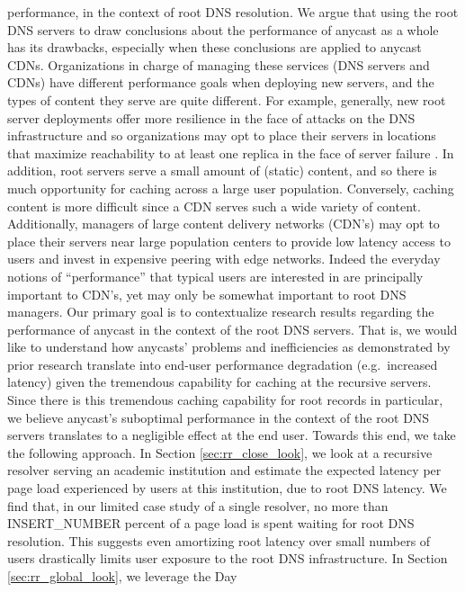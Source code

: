 \documentclass[sigconf,nonacm,10pt]{acmart}
\begin{document}
performance, in the context of root DNS resolution. \break \break
We argue that using the root DNS servers to draw conclusions about the
performance of anycast as a whole has its drawbacks, especially when
these conclusions are applied to anycast CDNs. Organizations in charge
of managing these services (DNS servers and CDNs) have different
performance goals when deploying new servers, and the types of content
they serve are quite different. For example, generally, new root server
deployments offer more resilience in the face of attacks on the DNS
infrastructure and so organizations may opt to place their servers in
locations that maximize reachability to at least one replica in the face
of server failure \cite{moura2016anycast}. In addition, root servers
serve a small amount of (static) content, and so there is much
opportunity for caching across a large user population. Conversely,
caching content is more difficult since a CDN serves such a wide variety
of content. Additionally, managers of large content delivery networks
(CDN's) may opt to place their servers near large population centers to
provide low latency access to users and invest in expensive peering with
edge networks. Indeed the everyday notions of ``performance'' that
typical users are interested in are principally important to CDN's, yet
may only be somewhat important to root DNS managers. \break \break
Our primary goal is to contextualize research results regarding the
performance of anycast in the context of the root DNS servers. That is,
we would like to understand how anycasts' problems and inefficiencies as
demonstrated by prior research translate into end-user performance
degradation (e.g.~increased latency) given the tremendous capability for
caching at the recursive servers. Since there is this tremendous caching
capability for root records in particular, we believe anycast's
suboptimal performance in the context of the root DNS servers translates
to a negligible effect at the end user. \break
Towards this end, we take the following approach. In Section
\ref{sec:rr_close_look}, we look at a recursive resolver serving an
academic institution and estimate the expected latency per page load
experienced by users at this institution, due to root DNS latency. We
find that, in our limited case study of a single resolver, no more than
INSERT\_NUMBER percent of a page load is spent waiting for root DNS
resolution. This suggests even amortizing root latency over small
numbers of users drastically limits user exposure to the root DNS
infrastructure. In Section \ref{sec:rr_global_look}, we leverage the Day
\end{document}
